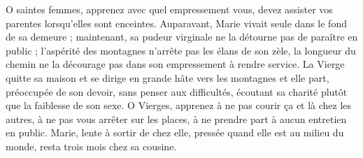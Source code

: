 O saintes femmes, apprenez avec quel empressement vous, devez assister vos parentes lorsqu’elles sont enceintes. Auparavant, Marie vivait seule dans le fond de sa demeure ; maintenant, sa pudeur virginale ne la détourne pas de paraître en public ; l’aspérité des montagnes n’arrête pas les élans de son zèle, la longueur du chemin ne la décourage pas dans son empressement à rendre service. La Vierge quitte sa maison et se dirige en grande hâte vers les montagnes et elle part, préoccupée de son devoir, sans penser aux difficultés, écoutant sa charité plutôt que la faiblesse de son sexe. O Vierges, apprenez à ne pas courir ça et là chez les autres, à ne pas vous arrêter sur les places, à ne prendre part à aucun entretien en public. Marie, lente à sortir de chez elle, pressée quand elle est au milieu du monde, resta trois mois chez sa cousine.